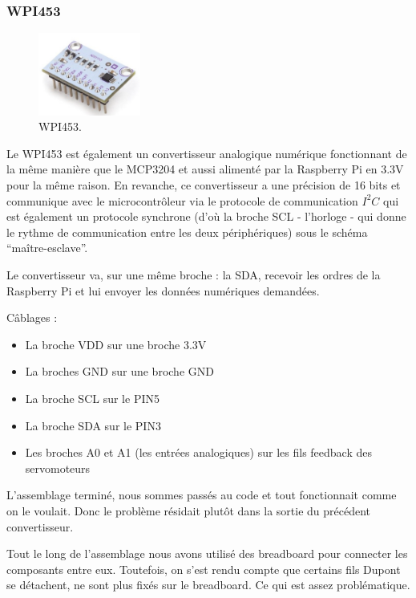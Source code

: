 \documentclass[a4paper,12pt]{report}  %
\begin{document}
\subsubsection{WPI453}

\begin{figure}[H]
	\centering
	\includegraphics[width=0.3\textwidth]{./attachments/WPI453.png}
	\caption{WPI453.}
\end{figure}

Le WPI453 est également un convertisseur analogique numérique fonctionnant de la même manière que le MCP3204 et aussi alimenté par la Raspberry Pi en 3.3V pour la même raison. En revanche, ce convertisseur a une précision de 16 bits et communique avec le microcontrôleur via le protocole de communication $I^2 C$ qui est également un protocole synchrone (d’où la broche SCL - l’horloge - qui donne le rythme de communication entre les deux périphériques) sous le schéma “maître-esclave”.

Le convertisseur va, sur une même broche : la SDA, recevoir les ordres de la Raspberry Pi et lui envoyer les données numériques demandées. 

Câblages : 

\begin{itemize}
	\item La broche VDD sur une broche 3.3V
	\item La broches GND sur une broche GND
	\item La broche SCL sur le PIN5
	\item La broche SDA sur le PIN3
	\item Les broches A0 et A1 (les entrées analogiques) sur les fils feedback des servomoteurs
\end{itemize}

L’assemblage terminé, nous sommes passés au code et tout fonctionnait comme on le voulait. Donc le problème résidait plutôt dans la sortie du précédent convertisseur.

Tout le long de l’assemblage nous avons utilisé des breadboard pour connecter les composants entre eux. Toutefois, on s’est rendu compte que certains fils Dupont se détachent, ne sont plus fixés sur le breadboard. Ce qui est assez problématique. 
\end{document}
